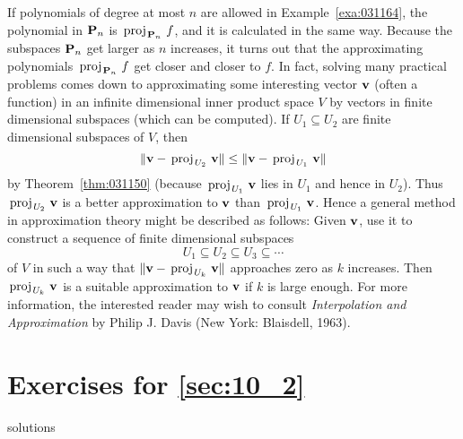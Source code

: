 If polynomials of degree at most $n$ are allowed in Example~\ref{exa:031164}, the polynomial in $\textbf{P}_n$ is $\thinspace\operatorname{proj\medspace}_{\!\textbf{P}_n}\,{f}$, and it is calculated in the same way. Because the subspaces $\textbf{P}_n$ get larger as $n$ increases, it turns out that the approximating polynomials $\thinspace\operatorname{proj\medspace}_{\!\textbf{P}_n}\,{f}$ get closer and closer to $f$. In fact, solving many practical problems comes down to approximating some interesting vector $\textbf{v}$ (often a function) in an infinite dimensional inner product space $V$ by vectors in finite dimensional subspaces (which can be computed). If $U_{1} \subseteq U_{2}$ are finite dimensional subspaces of $V$, then
\begin{equation*}
\| \textbf{v} - \thinspace\operatorname{proj\medspace}_{\!U_2}\,{\textbf{v}} \| \leq
\| \textbf{v} - \thinspace\operatorname{proj\medspace}_{\!U_1}\,{\textbf{v}} \|
\end{equation*}
by Theorem~\ref{thm:031150} (because $\thinspace\operatorname{proj\medspace}_{\!U_1}\,{\textbf{v}}$ lies in $U_{1}$ and hence in $U_{2}$). Thus $\thinspace\operatorname{proj\medspace}_{\!U_2}\,{\textbf{v}}$ is a better approximation to $\textbf{v}$ than $ \thinspace\operatorname{proj\medspace}_{\!U_1}\,{\textbf{v}} $. Hence a general method in approximation theory might be described as follows: Given $\textbf{v}$, use it to construct a sequence of finite dimensional subspaces
\begin{equation*}
U_1 \subseteq U_2 \subseteq U_3 \subseteq \cdots
\end{equation*}
of $V$ in such a way that $\| \textbf{v} - \thinspace\operatorname{proj\medspace}_{\!U_k}\,{\textbf{v}} \|$ approaches zero as $k$ increases. Then $ \thinspace\operatorname{proj\medspace}_{\!U_k}\,{\textbf{v}} $ is a suitable approximation to $\textbf{v}$ if $k$ is large enough. For more information, the interested reader may wish to consult \textit{Interpolation and Approximation} by Philip J. Davis (New York: Blaisdell, 1963).

\section*{Exercises for \ref{sec:10_2}}

\begin{Filesave}{solutions}
\end{Filesave}

